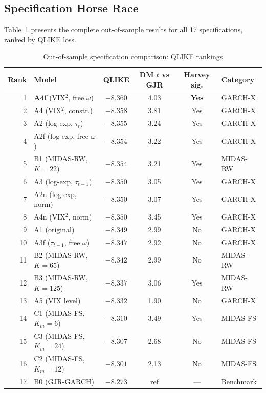 \documentclass[12pt,a4paper]{article}
\begin{document}
\subsection{Specification Horse Race}
\label{sec:horse_race}

Table~\ref{tab:main_results} presents the complete out-of-sample results for all 17 specifications, ranked by QLIKE loss.

\begin{table}[H]
\centering
\caption{Out-of-sample specification comparison: QLIKE rankings}
\label{tab:main_results}
\begin{threeparttable}
\small
\begin{tabular}{@{}rlcccl@{}}
\toprule
Rank & Model & QLIKE & DM $t$ vs GJR & Harvey sig. & Category \\
\midrule
1  & \textbf{A4f} (VIX$^2$, free $\omega$) & $\mathbf{-8.360}$ & $\mathbf{4.03}$ & \textbf{Yes} & GARCH-X \\
2  & A4 (VIX$^2$, constr.) & $-8.358$ & 3.81 & Yes & GARCH-X \\
3  & A2 (log-exp, $\tau_t$) & $-8.355$ & 3.24 & Yes & GARCH-X \\
4  & A2f (log-exp, free $\omega$) & $-8.354$ & 3.22 & Yes & GARCH-X \\
5  & B1 (MIDAS-RW, $K\!=\!22$) & $-8.354$ & 3.21 & Yes & MIDAS-RW \\
6  & A3 (log-exp, $\tau_{t-1}$) & $-8.350$ & 3.05 & Yes & GARCH-X \\
7  & A2n (log-exp, norm) & $-8.350$ & 3.07 & Yes & GARCH-X \\
8  & A4n (VIX$^2$, norm) & $-8.350$ & 3.45 & Yes & GARCH-X \\
9  & A1 (original) & $-8.349$ & 2.99 & No & GARCH-X \\
10 & A3f ($\tau_{t-1}$, free $\omega$) & $-8.347$ & 2.92 & No & GARCH-X \\
11 & B2 (MIDAS-RW, $K\!=\!65$) & $-8.342$ & 2.99 & No & MIDAS-RW \\
12 & B3 (MIDAS-RW, $K\!=\!125$) & $-8.337$ & 3.06 & Yes & MIDAS-RW \\
13 & A5 (VIX level) & $-8.332$ & 1.90 & No & GARCH-X \\
14 & C1 (MIDAS-FS, $K_m\!=\!6$) & $-8.310$ & 3.49 & Yes & MIDAS-FS \\
15 & C3 (MIDAS-FS, $K_m\!=\!24$) & $-8.307$ & 2.68 & No & MIDAS-FS \\
16 & C2 (MIDAS-FS, $K_m\!=\!12$) & $-8.301$ & 2.13 & No & MIDAS-FS \\
17 & B0 (GJR-GARCH) & $-8.273$ & ref & --- & Benchmark \\

\end{tabular}
\end{threeparttable}
\end{table}
\end{document}
